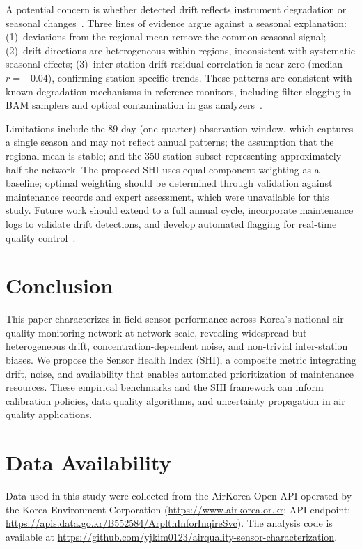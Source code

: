 \documentclass[12pt]{article}
\begin{document}
A potential concern is whether detected drift reflects instrument degradation or seasonal changes~\cite{miskell2018drift}. Three lines of evidence argue against a seasonal explanation: (1)~deviations from the regional mean remove the common seasonal signal; (2)~drift directions are heterogeneous within regions, inconsistent with systematic seasonal effects; (3)~inter-station drift residual correlation is near zero (median $r = -0.04$), confirming station-specific trends. These patterns are consistent with known degradation mechanisms in reference monitors, including filter clogging in BAM samplers and optical contamination in gas analyzers~\cite{shukla2022bam, heal2012particles}.

Limitations include the 89-day (one-quarter) observation window, which captures a single season and may not reflect annual patterns; the assumption that the regional mean is stable; and the 350-station subset representing approximately half the network. The proposed SHI uses equal component weighting as a baseline; optimal weighting should be determined through validation against maintenance records and expert assessment, which were unavailable for this study. Future work should extend to a full annual cycle, incorporate maintenance logs to validate drift detections, and develop automated flagging for real-time quality control~\cite{bai2020china, spinelle2017eufield}.

\section{Conclusion}

This paper characterizes in-field sensor performance across Korea's national air quality monitoring network at network scale, revealing widespread but heterogeneous drift, concentration-dependent noise, and non-trivial inter-station biases. We propose the Sensor Health Index (SHI), a composite metric integrating drift, noise, and availability that enables automated prioritization of maintenance resources. These empirical benchmarks and the SHI framework can inform calibration policies, data quality algorithms, and uncertainty propagation in air quality applications.

\section*{Data Availability}
Data used in this study were collected from the AirKorea Open API operated by the Korea Environment Corporation (\url{https://www.airkorea.or.kr}; API endpoint: \url{https://apis.data.go.kr/B552584/ArpltnInforInqireSvc}). The analysis code is available at \url{https://github.com/yjkim0123/airquality-sensor-characterization}.
\end{document}
